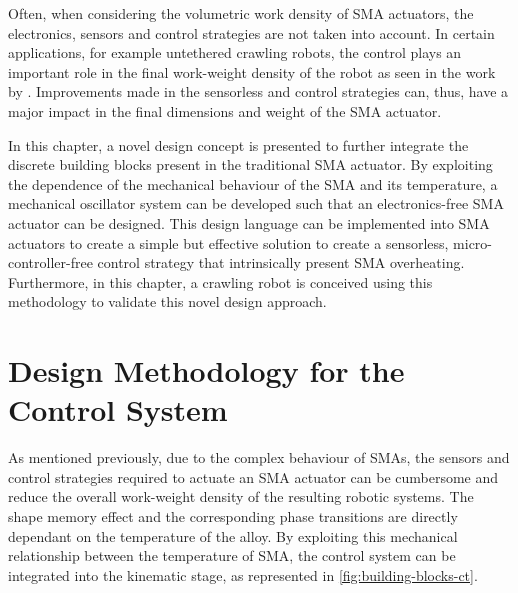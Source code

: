 Often, when considering the volumetric work density of SMA actuators, the electronics, sensors and control strategies are not taken into account. In certain applications, for example untethered crawling robots, the control plays an important role in the final work-weight density of the robot as seen in the work by \todocite. Improvements made in the sensorless and control strategies can, thus, have a major impact in the final dimensions and weight of the SMA actuator.

In this chapter, a novel design concept is presented to further integrate the discrete building blocks present in the traditional SMA actuator. By exploiting the dependence of the mechanical behaviour of the SMA and its temperature, a mechanical oscillator system can be developed such that an electronics-free SMA actuator can be designed. This design language can be implemented into SMA actuators to create a simple but effective solution to create a sensorless, micro-controller-free control strategy that intrinsically present SMA overheating. Furthermore, in this chapter, a crawling robot is conceived using this methodology to validate this novel design approach.

\section{Design Methodology for the Control System}
As mentioned previously, due to the complex behaviour of SMAs, the sensors and control strategies required to actuate an SMA actuator can be cumbersome and reduce the overall work-weight density of the resulting robotic systems. The shape memory effect and the corresponding phase transitions are directly dependant on the temperature of the alloy. By exploiting this mechanical relationship between the temperature of SMA, the control system can be integrated into the kinematic stage, as represented in \cref{fig:building-blocks-ct}.

